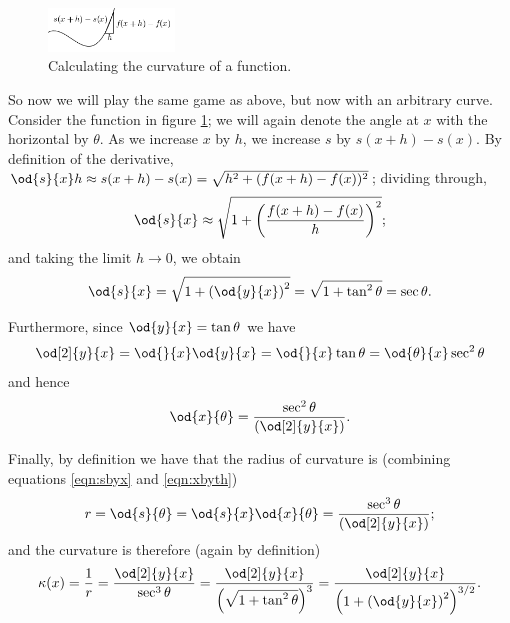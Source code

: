 \begin{figure}
  \centering
  \includegraphics[width=0.3\textwidth]{curvaturefunc}
  \caption{Calculating the curvature of a function.\label{fig:curvaturefunc}}
\end{figure}

So now we will play the same game as above, but now with an arbitrary curve. Consider the function
in figure \ref{fig:curvaturefunc}; we will again denote the angle at $ x $ with the horizontal by $ \theta $.
As we increase $ x $ by $ h $, we increase $ s $ by $ s(x + h) - s(x) $. By definition of the
derivative, $ \od{s}{x} h \approx s(x + h) - s(x) = \sqrt{h^2 + (f(x+h) -f(x))^2} $; dividing through,
\begin{displaymath}
  \od{s}{x} \approx \sqrt{1 + \left(\frac{f(x + h) - f(x)}{h}\right)^2};
\end{displaymath}
and taking the limit $ h \to 0 $, we obtain
\begin{equation}
  \od{s}{x} = \sqrt{1 + \left(\od{y}{x}\right)^2} = \sqrt{1 + \tan^2 \theta} = \sec \theta.\label{eqn:sbyx}
\end{equation}

Furthermore, since $ \od{y}{x} = \tan \theta $ we have
\begin{displaymath}
  \od[2]{y}{x} = \od{}{x} \od{y}{x} = \od{}{x} \tan \theta = \od{\theta}{x} \sec^2 \theta
\end{displaymath}
and hence
\begin{equation}
  \od{x}{\theta} = \frac{\sec^2 \theta}{\left(\od[2]{y}{x}\right)}.\label{eqn:xbyth}
\end{equation}

Finally, by definition we have that the radius of curvature is (combining equations \ref{eqn:sbyx} and \ref{eqn:xbyth})
\begin{displaymath}
  r = \od{s}{\theta} = \od{s}{x} \od{x}{\theta} = \frac{\sec^3 \theta}{\left(\od[2]{y}{x}\right)};
\end{displaymath}
and the curvature is therefore (again by definition)
\begin{displaymath}
  \kappa(x) = \frac{1}{r} = \frac{\od[2]{y}{x}}{\sec^3\theta} = \frac{\od[2]{y}{x}}{\left(\sqrt{1 + \tan^2 \theta}\right)^3}
            = \frac{\od[2]{y}{x}}{\left(1 + \left(\od{y}{x}\right)^2\right)^{3/2}}.
\end{displaymath}


